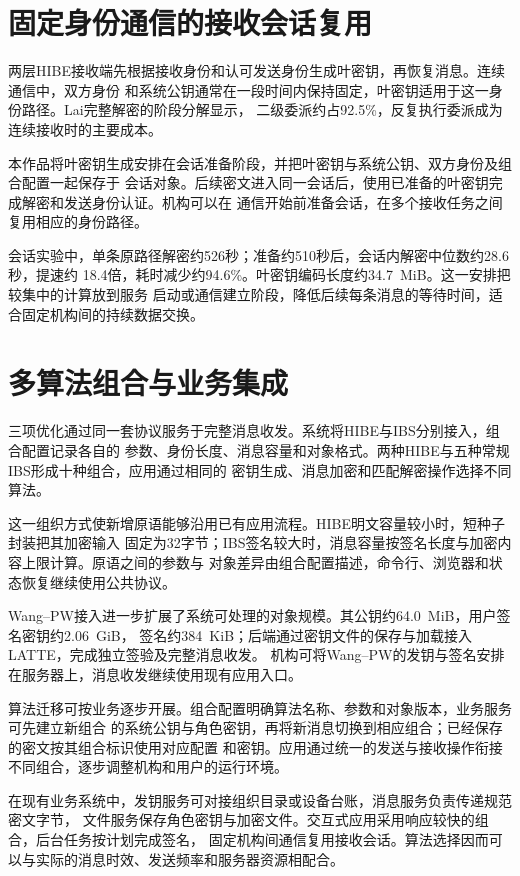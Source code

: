 \section{固定身份通信的接收会话复用}

两层HIBE接收端先根据接收身份和认可发送身份生成叶密钥，再恢复消息。连续通信中，双方身份
和系统公钥通常在一段时间内保持固定，叶密钥适用于这一身份路径。Lai完整解密的阶段分解显示，
二级委派约占92.5\%，反复执行委派成为连续接收时的主要成本。

本作品将叶密钥生成安排在会话准备阶段，并把叶密钥与系统公钥、双方身份及组合配置一起保存于
会话对象。后续密文进入同一会话后，使用已准备的叶密钥完成解密和发送身份认证。机构可以在
通信开始前准备会话，在多个接收任务之间复用相应的身份路径。

会话实验中，单条原路径解密约526秒；准备约510秒后，会话内解密中位数约28.6秒，提速约
18.4倍，耗时减少约94.6\%。叶密钥编码长度约34.7~MiB。这一安排把较集中的计算放到服务
启动或通信建立阶段，降低后续每条消息的等待时间，适合固定机构间的持续数据交换。

\section{多算法组合与业务集成}

三项优化通过同一套协议服务于完整消息收发。系统将HIBE与IBS分别接入，组合配置记录各自的
参数、身份长度、消息容量和对象格式。两种HIBE与五种常规IBS形成十种组合，应用通过相同的
密钥生成、消息加密和匹配解密操作选择不同算法。

这一组织方式使新增原语能够沿用已有应用流程。HIBE明文容量较小时，短种子封装把其加密输入
固定为32字节；IBS签名较大时，消息容量按签名长度与加密内容上限计算。原语之间的参数与
对象差异由组合配置描述，命令行、浏览器和状态恢复继续使用公共协议。

Wang--PW接入进一步扩展了系统可处理的对象规模。其公钥约64.0~MiB，用户签名密钥约2.06~GiB，
签名约384~KiB；后端通过密钥文件的保存与加载接入LATTE，完成独立签验及完整消息收发。
机构可将Wang--PW的发钥与签名安排在服务器上，消息收发继续使用现有应用入口。



算法迁移可按业务逐步开展。组合配置明确算法名称、参数和对象版本，业务服务可先建立新组合
的系统公钥与角色密钥，再将新消息切换到相应组合；已经保存的密文按其组合标识使用对应配置
和密钥。应用通过统一的发送与接收操作衔接不同组合，逐步调整机构和用户的运行环境。

在现有业务系统中，发钥服务可对接组织目录或设备台账，消息服务负责传递规范密文字节，
文件服务保存角色密钥与加密文件。交互式应用采用响应较快的组合，后台任务按计划完成签名，
固定机构间通信复用接收会话。算法选择因而可以与实际的消息时效、发送频率和服务器资源相配合。

